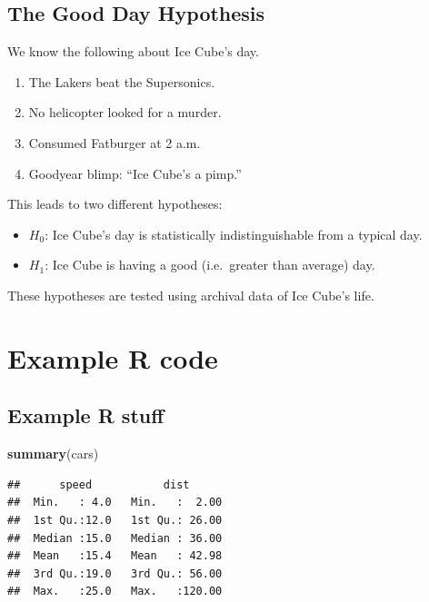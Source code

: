 \documentclass[11pt,]{article}
\newenvironment{Shaded}{\begin{snugshade}}{\end{snugshade}}
\newcommand{\KeywordTok}[1]{\textcolor[rgb]{0.13,0.29,0.53}{\textbf{#1}}}
\newcommand{\NormalTok}[1]{#1}
\providecommand{\tightlist}{%
\setlength{\itemsep}{0pt}\setlength{\parskip}{0pt}}
\begin{document}
\subsection{The Good Day Hypothesis}\label{the-good-day-hypothesis}

We know the following about Ice Cube's day.

\begin{enumerate}
\def\labelenumi{\arabic{enumi}.}
\tightlist
\item
  The Lakers beat the Supersonics.
\item
  No helicopter looked for a murder.
\item
  Consumed Fatburger at 2 a.m.
\item
  Goodyear blimp: ``Ice Cube's a pimp.''
\end{enumerate}

This leads to two different hypotheses:

\begin{itemize}
\tightlist
\item
  \(H_0\): Ice Cube's day is statistically indistinguishable from a
  typical day.
\item
  \(H_1\): Ice Cube is having a good (i.e.~greater than average) day.
\end{itemize}

These hypotheses are tested using archival data of Ice Cube's life.

\section{Example R code}\label{example-r-code}

\subsection{Example R stuff}\label{example-r-stuff}

\begin{Shaded}
\begin{Highlighting}[]
\KeywordTok{summary}\NormalTok{(cars)}
\end{Highlighting}
\end{Shaded}

\begin{verbatim}
##      speed           dist       
##  Min.   : 4.0   Min.   :  2.00  
##  1st Qu.:12.0   1st Qu.: 26.00  
##  Median :15.0   Median : 36.00  
##  Mean   :15.4   Mean   : 42.98  
##  3rd Qu.:19.0   3rd Qu.: 56.00  
##  Max.   :25.0   Max.   :120.00
\end{verbatim}
\end{document}
